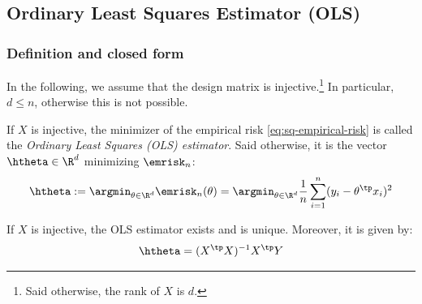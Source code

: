 \documentclass[toc, titlepaged]{../cs-classes/cs-classes}
\begin{document}
\subsection{Ordinary Least Squares Estimator (OLS)}
\subsubsection{Definition and closed form}
In the following, we assume that the design matrix is injective.\footnote{Said otherwise, the rank of $X$ is $d$.} In particular, $d\leq n$, otherwise this is not possible.

\begin{definition}
    If $X$ is injective, the minimizer of the empirical risk \eqref{eq:sq-empirical-risk} is called the \emph{Ordinary Least Squares (OLS) estimator}. Said otherwise, it is the vector $\htheta\in\R^d$ minimizing $\emrisk_n$:
    \begin{equation}
        \label{eq:ols-estimator}
        \htheta := \argmin_{\theta\in\R^d} \emrisk_n(\theta)=\argmin_{\theta\in\R^d}\frac{1}{n}\sum_{i=1}^n(y_i-\theta^\tp x_i)^2
    \end{equation}
\end{definition}

\begin{property}
    \label{prop:closed-form-OLS}
    If $X$ is injective, the OLS estimator exists and is unique. Moreover, it is given by:
    \begin{equation}
        \label{eq:closed-form-OLS}
        \htheta = (X^\tp X)^{-1}X^\tp Y
    \end{equation}
\end{property}
\end{document}
